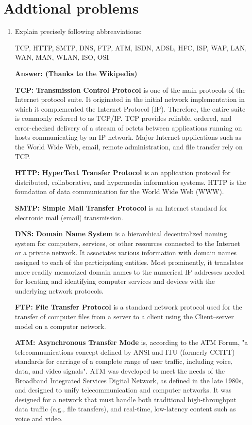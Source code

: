 \section{Addtional problems}

\begin{enumerate}
	\item 
	Explain precisely following abbreaviations:

	TCP, HTTP, SMTP, DNS, FTP, ATM, ISDN, ADSL, HFC, ISP, WAP, LAN, WAN, MAN, WLAN, ISO, OSI
	
	\textbf{Answer: (Thanks to the Wikipedia)}

	\qquad \textbf{TCP: Transmission Control Protocol} is one of the main protocols of the Internet protocol suite. It originated in the initial network implementation in which it complemented the Internet Protocol (IP). Therefore, the entire suite is commonly referred to as TCP/IP. TCP provides reliable, ordered, and error-checked delivery of a stream of octets between applications running on hosts communicating by an IP network. Major Internet applications such as the World Wide Web, email, remote administration, and file transfer rely on TCP.
	
	\qquad \textbf{HTTP: HyperText Transfer Protocol} is an application protocol for distributed, collaborative, and hypermedia information systems. HTTP is the foundation of data communication for the World Wide Web (WWW).
	
	\qquad \textbf{SMTP: Simple Mail Transfer Protocol} is an Internet standard for electronic mail (email) transmission.
	
	\qquad \textbf{DNS: Domain Name System} is a hierarchical decentralized naming system for computers, services, or other resources connected to the Internet or a private network. It associates various information with domain names assigned to each of the participating entities. Most prominently, it translates more readily memorized domain names to the numerical IP addresses needed for locating and identifying computer services and devices with the underlying network protocols.
	
	\qquad \textbf{FTP: File Transfer Protocol} is a standard network protocol used for the transfer of computer files from a server to a client using the Client–server model on a computer network.
	
	\qquad \textbf{ATM: Asynchronous Transfer Mode} is, according to the ATM Forum, "a telecommunications concept defined by ANSI and ITU (formerly CCITT) standards for carriage of a complete range of user traffic, including voice, data, and video signals". ATM was developed to meet the needs of the Broadband Integrated Services Digital Network, as defined in the late 1980s, and designed to unify telecommunication and computer networks. It was designed for a network that must handle both traditional high-throughput data traffic (e.g., file transfers), and real-time, low-latency content such as voice and video.
	

\end{enumerate}
